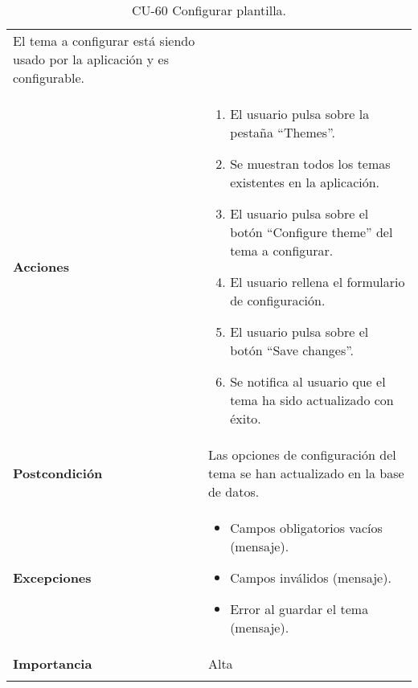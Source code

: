 \begin{longtable}[]{@{}ll@{}}
\begin{minipage}[t]{0.71\columnwidth}
El tema a configurar está siendo usado por la aplicación y es
configurable.\strut
\end{minipage}\tabularnewline
\begin{minipage}[t]{0.23\columnwidth}\raggedright
\textbf{Acciones}\strut
\end{minipage} & \begin{minipage}[t]{0.71\columnwidth}\raggedright
\begin{enumerate}
\def\labelenumi{\arabic{enumi}.}
\tightlist
\item
  El usuario pulsa sobre la pestaña ``Themes''.
\item
  Se muestran todos los temas existentes en la aplicación.
\item
  El usuario pulsa sobre el botón ``Configure theme'' del tema a
  configurar.
\item
  El usuario rellena el formulario de configuración.
\item
  El usuario pulsa sobre el botón ``Save changes''.
\item
  Se notifica al usuario que el tema ha sido actualizado con éxito.
\end{enumerate}\strut
\end{minipage}\tabularnewline
\begin{minipage}[t]{0.23\columnwidth}\raggedright
\textbf{Postcondición}\strut
\end{minipage} & \begin{minipage}[t]{0.71\columnwidth}\raggedright
Las opciones de configuración del tema se han actualizado en la base de
datos.\strut
\end{minipage}\tabularnewline
\begin{minipage}[t]{0.23\columnwidth}\raggedright
\textbf{Excepciones}\strut
\end{minipage} & \begin{minipage}[t]{0.71\columnwidth}\raggedright
\begin{itemize}
\tightlist
\item
  Campos obligatorios vacíos (mensaje).
\item
  Campos inválidos (mensaje).
\item
  Error al guardar el tema (mensaje).
\end{itemize}\strut
\end{minipage}\tabularnewline
\begin{minipage}[t]{0.23\columnwidth}\raggedright
\textbf{Importancia}\strut
\end{minipage} & \begin{minipage}[t]{0.71\columnwidth}\raggedright
Alta\strut
\end{minipage}\tabularnewline
\bottomrule
\caption{CU-60 Configurar plantilla.}
\end{longtable}

